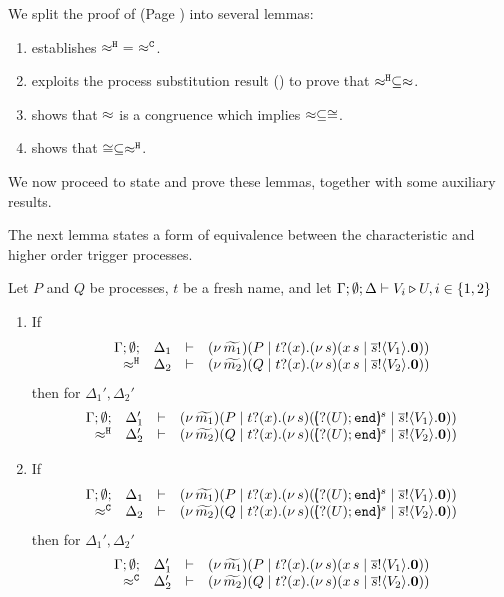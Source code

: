 \noi We split the proof of  (Page \pageref{the:coincidence}) into 
several lemmas:
\begin{enumerate}[$-$]
\item	{} establishes $\hwb\ =\ \fwb$.
\item	{} exploits the process substitution result
		() to prove that $\approx^\mathtt{H} \subseteq \approx$.
\item	{} shows that $\approx$ is a congruence
		which implies $\approx \subseteq \cong$.
\item	{} shows  that $\cong \subseteq \approx^\mathtt{H}$.
\end{enumerate}


\noi
We now proceed to state and prove these lemmas, together with some auxiliary results.

The next lemma states a form of equivalence between the characteristic
and higher order trigger processes.

\begin{lemma}
	\label{lem:trigger_equiv}
	Let $P$ and $Q$ be processes, $t$ be a fresh name, and
	let $\Gamma; \emptyset; \Delta \vdash V_i \triangleright U, i \in \{1, 2\}$

	\begin{enumerate}[1)]
		\item	If
				\[
					\begin{array}{rcll} \Gamma; \emptyset; &\Delta_1& \vdash& (\nu\, \widetilde{m_1})(P \;|\; t ? (x) . (\nu\, s)(x\, {s} \;|\; \overline{s} ! \langle V_1 \rangle . \mathbf{0}))\\ \approx^\mathtt{H} &\Delta_2& \vdash &  (\nu\, \widetilde{m_2})(Q \;|\; t ? (x) . (\nu\, s)(x\, {s} \;|\; \overline{s} ! \langle V_2 \rangle . \mathbf{0}) ) \end{array}
				\]
				then for $\Delta_1', \Delta_2'$
				\[
					\mhorel{\Gamma}{\Delta_1'}{\newsp{\widetilde{m_1}}{P \Par \fotrigger{t}{x}{s}{\btinp{U} \tinact}{V_1}}}
					{\hwb}
					{\Delta_2'}{}{\newsp{\widetilde{m_2}}{Q \Par \fotrigger{t}{x}{s}{\btinp{U} \tinact}{V_2}}}
				\]

		\item	If
				\[
					\mhorel{\Gamma}{\Delta_1}{\newsp{\widetilde{m_1}}{P \Par \fotrigger{t}{x}{s}{\btinp{U} \tinact}{V_1}}}
					{\fwb}
					{\Delta_2}{}{\newsp{\widetilde{m_2}}{Q \Par \fotrigger{t}{x}{s}{\btinp{U} \tinact}{V_2}}}
				\]
				then for $\Delta_1', \Delta_2'$
				\[
					\begin{array}{rcll} \Gamma; \emptyset; &\Delta_1'& \vdash& (\nu\, \widetilde{m_1})(P \;|\; t ? (x) . (\nu\, s)(x\, {s} \;|\; \overline{s} ! \langle V_1 \rangle . \mathbf{0}))\\ \approx^\mathtt{C} &\Delta_2'& \vdash &  (\nu\, \widetilde{m_2})(Q \;|\; t ? (x) . (\nu\, s)(x\, {s} \;|\; \overline{s} ! \langle V_2 \rangle . \mathbf{0}) ) \end{array}
				\]
	\end{enumerate}
\end{lemma}

